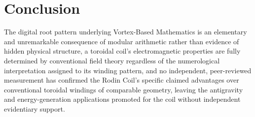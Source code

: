 \documentclass[11pt]{article}
\begin{document}
\section{Conclusion}

The digital root pattern underlying Vortex-Based Mathematics is an elementary and unremarkable consequence of modular arithmetic rather than evidence of hidden physical structure, a toroidal coil's electromagnetic properties are fully determined by conventional field theory regardless of the numerological interpretation assigned to its winding pattern, and no independent, peer-reviewed measurement has confirmed the Rodin Coil's specific claimed advantages over conventional toroidal windings of comparable geometry, leaving the antigravity and energy-generation applications promoted for the coil without independent evidentiary support.
\end{document}
